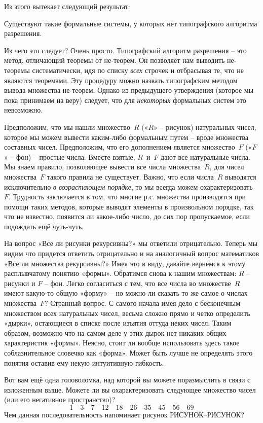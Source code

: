 \documentclass[../main.tex]{subfiles}
\begin{document}
Из этого вытекает следующий результат:
%
\begin{block}
    Существуют такие формальные системы, у которых нет типографского алгоритма разрешения.
\end{block}
%
Из чего это следует?
Очень просто.
Типографский алгоритм разрешения \--- это метод, отличающий теоремы от не-теорем.
Он позволяет нам выводить не-теоремы систематически, идя по списку \emph{всех} строчек и отбрасывая те, что не являются теоремами.
Эту процедуру можно назвать типографским методом вывода множества не-теорем.
Однако из предыдущего утверждения (которое мы пока принимаем на веру) следует, что для \emph{некоторых} формальных систем это невозможно.

Предположим, что мы нашли множество~$R$ («$R$» \--- рисунок) натуральных чисел, которое мы можем вывести каким-либо формальным путем \--- вроде множества составных чисел. Предположим, что его дополнением является множество~$F$ («$F$» \--- фон) \--- простые числа.
Вместе взятые, $R$~и~$F$ дают все натуральные числа.
Мы знаем правило, позволяющее вывести все числа множества~$R$, для чисел множества~$F$ такого правила не существует.
Важно, что если числа~$R$ выводятся исключительно \emph{в возрастающем порядке}, то мы всегда можем охарактеризовать~$F$.
Трудность заключается в том, что многие р.с. множества производятся при помощи таких методов, которые выводят элементы в произвольном порядке, так что не известно, появится ли какое-либо число, до сих пор пропускаемое, если подождать ещё чуть-чуть.

На вопрос «Все ли рисунки рекурсивны?» мы ответили отрицательно.
Теперь мы видим что придется ответить отрицательно и на аналогичный вопрос математиков «Все ли множества рекурсивны?»
Имея это в виду, давайте вернемся к этому расплывчатому понятию «формы».
Обратимся снова к нашим множествам: $R$ \--- рисунки и $F$ \--- фон.
Легко согласиться с тем, что все числа во множестве~$R$ имеют какую-то общую «форму» \--- но можно ли сказать то же самое о числах множества~$F$?
Странный вопрос.
С самого начала имея дело с бесконечным множеством всех натуральных чисел, весьма сложно прямо и четко определить «дырки», остающиеся в списке после изъятия оттуда неких чисел.
Таким образом, возможно что на самом деле у этих дырок нет никаких общих характеристик «формы».
Неясно, стоит ли вообще использовать здесь такое соблазнительное словечко как «форма».
Может быть лучше не определять этого понятия оставив ему некую интуитивную гибкость.

Вот вам ещё одна головоломка, над которой вы можете поразмыслить в связи с изложенным выше.
Можете ли вы охарактеризовать следующее множество чисел (или его негативное пространство)?
\[
    1 \quad 3 \quad 7 \quad 12 \quad 18 \quad 26 \quad 35 \quad 45 \quad 56 \quad 69
\]
Чем данная последовательность напоминает рисунок РИСУНОК--РИСУНОК?
\end{document}
